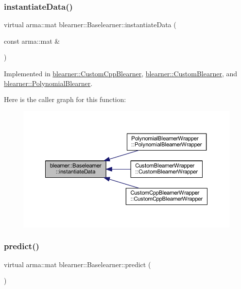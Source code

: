 \subsubsection{\texorpdfstring{instantiate\+Data()}{instantiateData()}}
{\footnotesize\ttfamily virtual arma\+::mat blearner\+::\+Baselearner\+::instantiate\+Data (\begin{DoxyParamCaption}\item[{const arma\+::mat \&}]{ }\end{DoxyParamCaption})\hspace{0.3cm}{\ttfamily [pure virtual]}}



Implemented in \mbox{\hyperlink{classblearner_1_1_custom_cpp_blearner_a14607a1d1f312d46a3024b37085c146d}{blearner\+::\+Custom\+Cpp\+Blearner}}, \mbox{\hyperlink{classblearner_1_1_custom_blearner_a18971368219f6948456b8e60c20b6968}{blearner\+::\+Custom\+Blearner}}, and \mbox{\hyperlink{classblearner_1_1_polynomial_blearner_a5d3a44e8a4a8155ac24ee05e2c68af75}{blearner\+::\+Polynomial\+Blearner}}.

Here is the caller graph for this function\+:\nopagebreak
\begin{figure}[H]
\begin{center}
\leavevmode
\includegraphics[width=350pt]{classblearner_1_1_baselearner_af01f1b8c4540927705ff79c3649489f7_icgraph}
\end{center}
\end{figure}
\mbox{\label{classblearner_1_1_baselearner_ab37986047db43c84420fef2cef7fc20d}} 
\subsubsection{\texorpdfstring{predict()}{predict()}\hspace{0.1cm}{\footnotesize\ttfamily [1/2]}}
{\footnotesize\ttfamily virtual arma\+::mat blearner\+::\+Baselearner\+::predict (\begin{DoxyParamCaption}{ }\end{DoxyParamCaption})\hspace{0.3cm}{\ttfamily [pure virtual]}}



